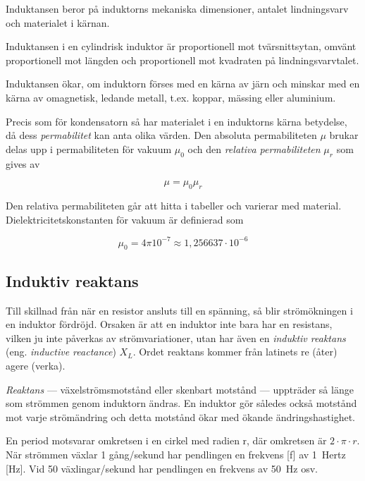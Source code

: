 Induktansen beror på induktorns mekaniska dimensioner, antalet lindningsvarv och
materialet i kärnan.

Induktansen i en cylindrisk induktor är proportionell mot tvärsnittsytan, omvänt
proportionell mot längden och proportionell mot kvadraten på lindningsvarvtalet.

Induktansen ökar, om induktorn förses med en kärna av järn och minskar med en
kärna av omagnetisk, ledande metall, t.ex. koppar, mässing eller aluminium.

Precis som för kondensatorn så har materialet i en induktorns kärna betydelse,
då dess \emph{permabilitet} kan anta olika värden. Den absoluta permabiliteten
\(\mu\) brukar delas upp i permabiliteten för vakuum \(\mu_0\) och den
\emph{relativa permabiliteten} \(\mu_r\) som gives av

\[ \mu = \mu_0\mu_r \]

Den relativa permabiliteten går att hitta i tabeller och varierar med material.
Dielektricitetskonstanten för vakuum är definierad som

\[ \mu_0 = 4\pi 10^{-7} \approx 1,256637 \cdot 10^{-6} \]

\subsection{Induktiv reaktans}

Till skillnad från när en resistor ansluts till en spänning, så blir
strömökningen i en induktor fördröjd. Orsaken är att en induktor inte bara har
en resistans, vilken ju inte påverkas av strömvariationer, utan har även en
\emph{induktiv reaktans} (eng. \emph{inductive reactance}) \(X_L\).
Ordet reaktans kommer från latinets re (åter) agere (verka).

\emph{Reaktans} --- växelströmsmotstånd eller skenbart motstånd --- uppträder så
länge som strömmen genom induktorn ändras. En induktor gör således också
motstånd mot varje strömändring och detta motstånd ökar med ökande
ändringshastighet. 

En period motsvarar omkretsen i en cirkel med radien r, där omkretsen är
\(2 \cdot \pi  \cdot r\). När strömmen växlar 1 gång/sekund har
pendlingen en frekvens [f] av 1~Hertz [Hz]. Vid 50 växlingar/sekund har
pendlingen en frekvens av 50~Hz osv.

